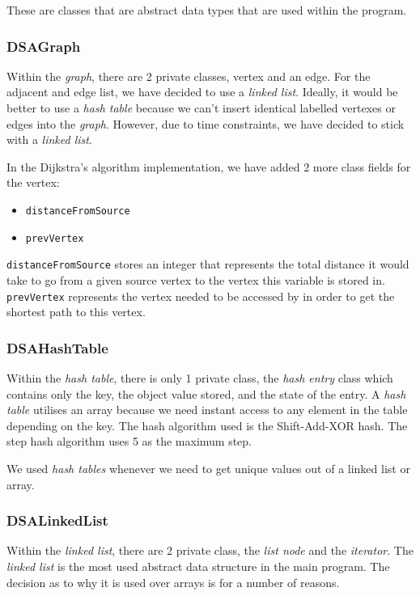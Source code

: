 \documentclass[a4paper, 12pt, titlepage]{article}
\newcommand{\code}[1]{\small\texttt{#1}\normalsize}
\begin{document}
These are classes that are abstract data types that are used within the
program.

\subsubsection{DSAGraph}

Within the \textit{graph}, there are 2 private classes, vertex and an edge.
For the adjacent and edge list, we have decided to use a \textit{linked list}.
Ideally, it would be better to use a \textit{hash table} because we can't
insert identical labelled vertexes or edges into the \textit{graph}. However,
due to time constraints, we have decided to stick with a \textit{linked list}.

In the Dijkstra's algorithm implementation, we have added 2 more class fields
for the vertex:

\begin{itemize}[label={--}]
    \item \code{distanceFromSource}
    \item \code{prevVertex}
\end{itemize}

\code{distanceFromSource} stores an integer that represents the total distance
it would take to go from a given source vertex to the vertex this variable is
stored in. \code{prevVertex} represents the vertex needed to be accessed by in
order to get the shortest path to this vertex.

\subsubsection{DSAHashTable}

Within the \textit{hash table}, there is only 1 private class, the
\textit{hash entry} class which contains only the key, the object value stored,
and the state of the entry. A \textit{hash table} utilises an array because
we need instant access to any element in the table depending on the key.
The hash algorithm used is the Shift-Add-XOR hash. The step hash algorithm
uses 5 as the maximum step.

We used \textit{hash tables} whenever we need to get unique values out of a
linked list or array.

\subsubsection{DSALinkedList}

Within the \textit{linked list}, there are 2 private class, the
\textit{list node} and the \textit{iterator}. The \textit{linked list} is the
most used abstract data structure in the main program. The decision as to
why it is used over arrays is for a number of reasons.
\end{document}

